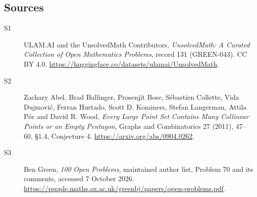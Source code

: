 \documentclass[11pt]{article}
\begin{document}
\subsection{Sources}
\begin{description}
\item[\hypertarget{source:131:1}{S1}] ULAM.AI and the UnsolvedMath Contributors, \emph{UnsolvedMath: A Curated Collection of Open Mathematics Problems}, record 131 (GREEN-043). CC BY 4.0. \url{https://huggingface.co/datasets/ulamai/UnsolvedMath}.
\item[\hypertarget{source:131:2}{S2}] Zachary Abel, Brad Ballinger, Prosenjit Bose, Sébastien Collette, Vida Dujmović, Ferran Hurtado, Scott D. Kominers, Stefan Langerman, Attila Pór and David R. Wood, \emph{Every Large Point Set Contains Many Collinear Points or an Empty Pentagon}, Graphs and Combinatorics 27 (2011), 47--60, §1.4, Conjecture 4. \url{https://arxiv.org/abs/0904.0262}.
\item[\hypertarget{source:131:3}{S3}] Ben Green, \emph{100 Open Problems}, maintained author list, Problem 70 and its comments, accessed 7 October 2026. \url{https://people.maths.ox.ac.uk/greenbj/papers/open-problems.pdf}.
\end{description}
\label{end:131}
\end{document}
